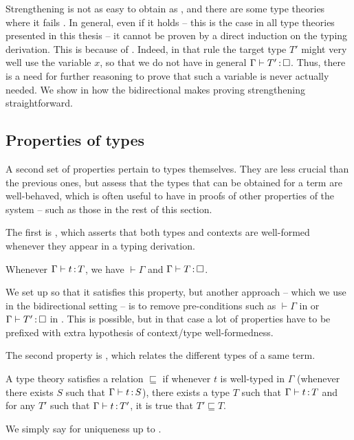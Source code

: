 Strengthening is not as easy to obtain as , and there are some type theories
where it fails .
In general, even if it holds – this is the case in all type theories 
presented in this thesis – it cannot be proven by a direct induction on the typing
derivation. This is because of . Indeed, in that rule the target type
$T'$ might very well use the variable $x$, so that we do not have in general
$\Gamma \vdash T' \ty \uni$. Thus, there is a need for further reasoning to prove that such a
variable is never actually needed. We show in  how the bidirectional
makes proving strengthening straightforward.

\subsection{Properties of types}

A second set of properties pertain to types themselves. They are less crucial than the
previous ones, but assess that the types that can be obtained for a term are well-behaved,
which is often useful to have in proofs of other properties of
the system – such as those in the rest of this section.

The first is ,
which asserts that both types and contexts are well-formed whenever they appear in a typing
derivation.

\begin{property}
  \label{prop:validity}
  Whenever $\Gamma \vdash t \operatorname{:} T$, we have $\vdash \Gamma$ and $\Gamma \vdash T \ty \uni$.
\end{property}

We set up  so that it satisfies this property, but another approach – which we use
in the bidirectional setting – is to remove pre-conditions such as $\vdash \Gamma$ in
 or $\Gamma \vdash T' \ty \uni$ in .
This is possible, but in that case a lot of properties have to be prefixed with extra
hypothesis of context/type well-formedness.

The second property is , which relates the different types
of a same term.

\begin{property}
  \label{prop:uniqueness}
  A type theory satisfies  a relation $\sqsubseteq$
  if whenever $t$ is well-typed in $\Gamma$ (\ie whenever there exists $S$ such that $\Gamma \vdash t \operatorname{:} S$), there exists a type $T$ such that $\Gamma \vdash t \operatorname{:} T$
  and for any $T'$ such that $\Gamma \vdash t \operatorname{:} T'$, it is true that $T' \sqsubseteq T$.

  We simply say  for uniqueness up to .
\end{property}

